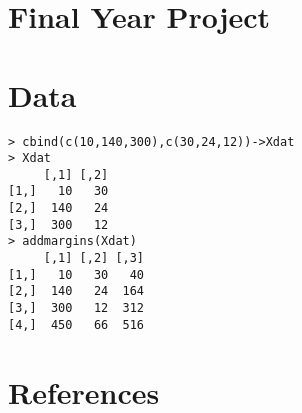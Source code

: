\documentclass[a4paper,12pt]{article}
\begin{document}
\tableofcontents
\newpage
\section{Final Year Project}

\newpage
\section{Data}
\begin{framed}
\begin{verbatim}
> cbind(c(10,140,300),c(30,24,12))->Xdat
> Xdat
     [,1] [,2]
[1,]   10   30
[2,]  140   24
[3,]  300   12
> addmargins(Xdat)
     [,1] [,2] [,3]
[1,]   10   30   40
[2,]  140   24  164
[3,]  300   12  312
[4,]  450   66  516
\end{verbatim}
\end{framed}
\newpage
\section{References}
\end{document}
